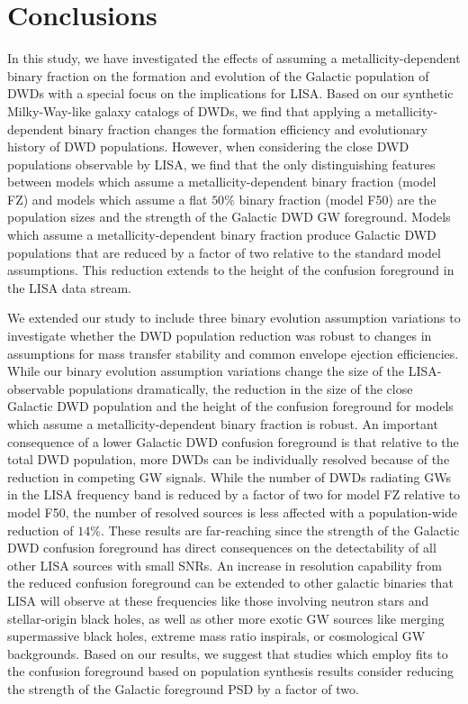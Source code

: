 \documentclass[twocolumn]{aastex631}
\begin{document}
\section{Conclusions}\label{sec:conclusions}
In this study, we have investigated the effects of assuming a metallicity-dependent binary fraction on the formation and evolution of the Galactic population of DWDs with a special focus on the implications for LISA. Based on our synthetic Milky-Way-like galaxy catalogs of DWDs, we find that applying a metallicity-dependent binary fraction changes the formation efficiency and evolutionary history of DWD populations. However, when considering the close DWD populations observable by LISA, we find that the only distinguishing features between models which assume a metallicity-dependent binary fraction (model FZ) and models which assume a flat $50\%$ binary fraction (model F50) are the population sizes and the strength of the Galactic DWD GW foreground. Models which assume a metallicity-dependent binary fraction produce Galactic DWD populations that are reduced by a factor of two relative to the standard model assumptions. This reduction extends to the height of the confusion foreground in the LISA data stream. 

We extended our study to include three binary evolution assumption variations to investigate whether the DWD population reduction was robust to changes in assumptions for mass transfer stability and common envelope ejection efficiencies. While our binary evolution assumption variations change the size of the LISA-observable populations dramatically, the reduction in the size of the close Galactic DWD population and the height of the confusion foreground for models which assume a metallicity-dependent binary fraction is robust. An important consequence of a lower Galactic DWD confusion foreground is that relative to the total DWD population, more DWDs can be individually resolved because of the reduction in competing GW signals. While the number of DWDs radiating GWs in the LISA frequency band is reduced by a factor of two for model FZ relative to model F50, the number of resolved sources is less affected with a population-wide reduction of $14\%$. These results are far-reaching since the strength of the Galactic DWD confusion foreground has direct consequences on the detectability of all other LISA sources with small SNRs. An increase in resolution capability from the reduced confusion foreground can be extended to other galactic binaries that LISA will observe at these frequencies like those involving neutron stars and stellar-origin black holes, as well as other more exotic GW sources like merging supermassive black holes, extreme mass ratio inspirals, or cosmological GW backgrounds. Based on our results, we suggest that studies which employ fits to the confusion foreground based on population synthesis results consider reducing the strength of the Galactic foreground PSD by a factor of two.
\end{document}
